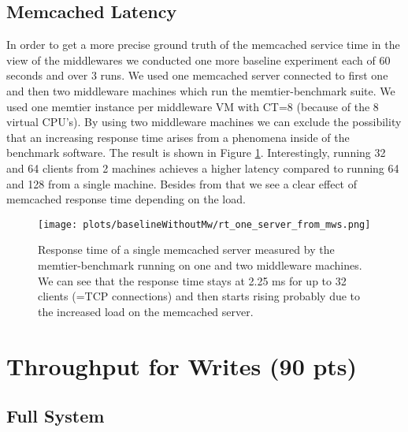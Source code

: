 \documentclass[11pt,a4paper]{article}
\begin{document}
\subsection{Memcached Latency}\label{sub:bl:memcached_latency}
In order to get a more precise ground truth of the memcached service time in the view of the middlewares we conducted one more baseline experiment each of 60 seconds and over 3 runs. We used one memcached server connected to first one and then two middleware machines which run the memtier-benchmark suite. We used one memtier instance per middleware VM with CT=8 (because of the 8 virtual CPU's). By using two middleware machines we can exclude the possibility that an increasing response time arises from a phenomena inside of the benchmark software. The result is shown in Figure \ref{plt:bl:one_server_two_mw}. Interestingly, running 32 and 64 clients from 2 machines achieves a higher latency compared to running 64 and 128 from a single machine. Besides from that we see a clear effect of memcached response time depending on the load.

\begin{figure}
    \centering
    \texttt{[image: plots/baselineWithoutMw/rt\_one\_server\_from\_mws.png]}
    \caption{Response time of a single memcached server measured by the memtier-benchmark running on one and two middleware machines. We can see that the response time stays at 2.25 ms for up to 32 clients (=TCP connections) and then starts rising probably due to the increased load on the memcached server.}
    \label{plt:bl:one_server_two_mw}
\end{figure}





\section{Throughput for Writes (90 pts)}\label{sec:writes}

\subsection{Full System}
\end{document}
